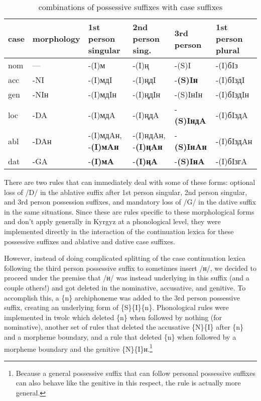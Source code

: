 \documentclass[10pt,a4paper,twocolumn]{article}
\begin{document}
\begin{table*}[htbp]
	\caption{combinations of possessive suffixes with case suffixes}\label{irregposcase}
	\centering
	\begin{tabular}{llllll}
		\toprule
		case & morphology & 1st person singular & 2nd person sing. & 3rd person & 1st person plural \\
		\midrule
		nom & — & -(I)м & -(I)ң & -(S)I & -(I)бIз \\
		acc & -NI & -(I)мдI & -(I)ңдI & -\textbf{(S)Iн} & -(I)бIздI \\
		gen & -NIн & -(I)мдIн & -(I)ңдIн & -(S)IнIн & -(I)бIздIн \\
		loc & -DA & -(I)мдA & -(I)ңдA & -\textbf{(S)IндA} & -(I)бIздA \\
		abl & -DAн & -(I)мдAн, -\textbf{(I)мAн} & -(I)ндAн, -\textbf{(I)ңAн} & -\textbf{(S)IнAн} & -(I)бIздAн \\
		dat & -GA & -\textbf{(I)мA} & -\textbf{(I)ңA} & -\textbf{(S)IнA} & -(I)бIзгA \\
		\bottomrule
	\end{tabular}
\end{table*}

There are two rules that can immediately deal with some of these forms: optional loss of /D/ in the ablative suffix after 1st person singular, 2nd person singular, and 3rd person possession suffixes, and mandatory loss of /G/ in the dative suffix in the same situations.  Since these are rules specific to these morphological forms and don’t apply generally in Kyrgyz at a phonological level, they were implemented directly in the interaction of the continuation lexica for these possessive suffixes and ablative and dative case suffixes.

However, instead of doing complicated splitting of the case continuation lexica following the third person possessive suffix to sometimes insert /н/, we decided to proceed under the premise that /н/ was instead underlying in this suffix (and a couple others!) and got deleted in the nominative, accusative, and genitive.  To accomplish this, a \{n\} archiphoneme was added to the 3rd person possessive suffix, creating an underlying form of \{S\}\{I\}\{n\}.  Phonological rules were implemented in twolc which deleted \{n\} when followed by nothing (for nominative), another set of rules that deleted the accusative \{N\}\{I\} after \{n\} and a morpheme boundary, and a rule that deleted \{n\} when followed by a morpheme boundary and the genitive \{N\}\{I\}н.\footnote{Because a general possessive suffix that can follow personal possessive suffixes can also behave like the genitive in this respect, the rule is actually more general.}
\end{document}
